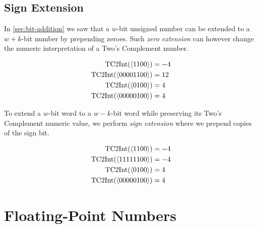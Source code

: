 \subsection{Sign Extension}
\label{sec:sign-extension}

In \cref{sec:bit-addition} we saw that a $w$-bit unsigned number can
be extended to a $w+k$-bit number by prepending zeroes.  Such
\emph{zero extension} can however change the numeric interpretation of
a Two's Complement number.

\begin{example}
  \begin{align*}
    \mathrm{TC2Int}(\langle 1100 \rangle) &= -4 \\
    \mathrm{TC2Int}(\langle 00001100 \rangle) &= 12 \\
    \mathrm{TC2Int}(\langle 0100 \rangle) &= 4 \\
    \mathrm{TC2Int}(\langle 00000100 \rangle) &= 4
  \end{align*}
\end{example}

To extend a $w$-bit word to a $w-k$-bit word while preserving its
Two's Complement numeric value, we perform \emph{sign extension} where
we prepend copies of the sign bit.

\begin{example}
  \begin{align*}
    \mathrm{TC2Int}(\langle 1100 \rangle) &= -4 \\
    \mathrm{TC2Int}(\langle 11111100 \rangle) &= -4 \\
    \mathrm{TC2Int}(\langle 0100 \rangle) &= 4 \\
    \mathrm{TC2Int}(\langle 00000100 \rangle) &= 4 \\
  \end{align*}
\end{example}

\section{Floating-Point Numbers}
\label{sec:floats}

